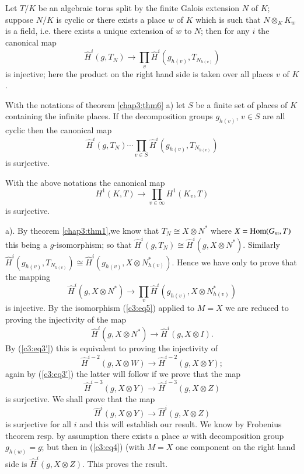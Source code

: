 \begin{thm}[a]\label{chap3:thm6}
Let $T/K$ be an algebraic torus split by the finite Galois
extension $N$ of $K$; suppose $N/K$ is cyclic or there exists a place
$w$ of $K$ which is such that $N \otimes_K K_w$ is a field, i.e. there
exists a unique extension of $w$ to $N$; then for any $i$ the canonical
map 
\begin{equation*}
\hat{H}^i(g, T_N) \longrightarrow \prod_v \hat{H}^i(g_{h(v)}, T_{N_{h(v)}})
\tag{6}\label{c3:eq6} 
\end{equation*}
is injective; here the product on the right hand side is taken over
all places $v$ of $K$. 
\end{thm}

\setcounter{thm}{5}
\begin{thm}[b]\label{chap3:thm6b}%
With the notations of theorem \ref{chap3:thm6} a) let $S$ be a finite set of
places of $K$ containing the infinite places. If the decomposition
groups $g_{h(v)}$, $v \in S$ are all cyclic then the canonical map 
\begin{equation*}
\hat{H}^i(g, T_N) \cdots \prod_{v \in S} \hat{H}^i(g_{h(v)},
T_{N_{h(v)}}) \tag{7}\label{c3:eq7} 
\end{equation*}
is surjective.
\end{thm}

\begin{coro*}
With the above notations the canonical map 
$$
H^1 (K,T) \longrightarrow  \prod_{v \in \infty} H^1 (K_v , T)
$$
is surjective.
\end{coro*}

\setcounter{proofoftheorem}{5}
\begin{proofoftheorem}%
a). By theorem \ref{chap3:thm1},\pageoriginale we know that $T_N \cong
X \otimes N^*$ where $X = 
\operatorname{Hom} (G_m, T)$ this being a $g$-isomorphism; so that $\hat{H}^{i}
(g,T_N) \cong \hat{H}^{i} (g,X \otimes N^*)$. Similarly $\hat{H}^{i}
(g_{h(v)}, T_{N_{h(v)}}) \cong \hat{H}^{i} (g_{h(v)}, X \otimes
N^*_{h(v)})$. Hence we have only to prove that the mapping 
$$
\hat{H}^{i} (g, X \otimes N^*) \longrightarrow \prod_v \hat{H}^{i} 
(g_{h(v)}, X \otimes N^*_{h(v)}) 
$$
is injective. By the isomorphism (\ref{c3:eq5}) applied to $M = X$ we are
reduced to proving the injectivity of the map 
$$
\hat{H}^{i} (g,X \otimes N^*) \longrightarrow \hat{H}^{i} (g,X \otimes I).
$$
By (\ref{c3:eq3'}) this is equivalent to proving the injectivity of 
$$
\hat{H}^{i-2} (g,X \otimes W) \longrightarrow \hat{H}^{i-2} (g,X \otimes Y);
$$
again by (\ref{c3:eq3'}) the latter will follow if we prove that the map
$$
\hat{H}^{i-3} (g,X \otimes Y) \longrightarrow \hat{H}^{i-3} (g,X \otimes
Z) 
$$
is surjective. We shall prove that the map 
$$
\hat{H}^{i} (g,X \otimes Y) \longrightarrow \hat{H}^{i} (g,X \otimes Z)
$$
is surjective for all $i$ and this will establish our result. We know
by Frobenius theorem resp. by assumption there exists a place $w$ with
decomposition group $g_{h(w)} = g$; but then in (\ref{c3:eq4}) (with $M =X$ one
component on the right hand side is $\hat{H}^{i} (g,X \otimes
Z)$. This proves the result. 
\end{proofoftheorem}


